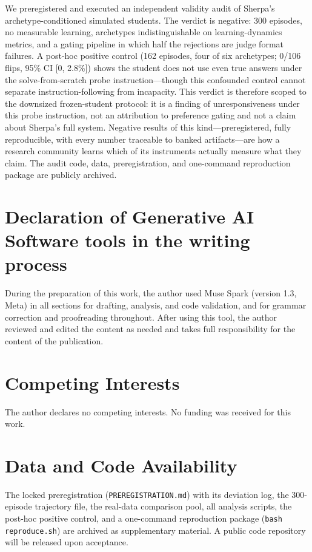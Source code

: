 \documentclass[notitlepage,12pt]{jedm}
\begin{document}
We preregistered and executed an independent validity audit of Sherpa's
archetype-conditioned simulated students. The verdict is negative: 300
episodes, no measurable learning, archetypes indistinguishable on
learning-dynamics metrics, and a
gating pipeline in which half the rejections are judge format failures.
A post-hoc positive control (162 episodes, four of six archetypes; 0/106
flips, 95\% CI [0, 2.8\%]) shows the student does not use even true
answers under the solve-from-scratch probe instruction---though this
confounded control cannot separate instruction-following from incapacity.
This verdict is therefore scoped to the downsized frozen-student protocol:
it is a finding of unresponsiveness under this probe instruction, not an
attribution to preference gating and not a claim about Sherpa's full
system.
Negative results of this kind---preregistered, fully reproducible, with
every number traceable to banked artifacts---are how a research community
learns which of its instruments actually measure what they claim. The audit
code, data, preregistration, and one-command reproduction package are
publicly archived.

\section*{Declaration of Generative AI Software tools in the writing process}

During the preparation of this work, the author used Muse Spark (version
1.3, Meta) in all sections for drafting, analysis, and code validation,
and for grammar correction and proofreading throughout. After using this
tool, the author reviewed and edited the content as needed and takes full
responsibility for the content of the publication.

\section*{Competing Interests}

The author declares no competing interests. No funding was received for
this work.

\section*{Data and Code Availability}

The locked preregistration (\texttt{PREREGISTRATION.md}) with its
deviation log, the 300-episode trajectory file, the real-data comparison
pool, all analysis scripts, the post-hoc positive control, and a
one-command reproduction package (\texttt{bash reproduce.sh}) are archived
as supplementary material. A public code repository will be released upon
acceptance.
\end{document}
